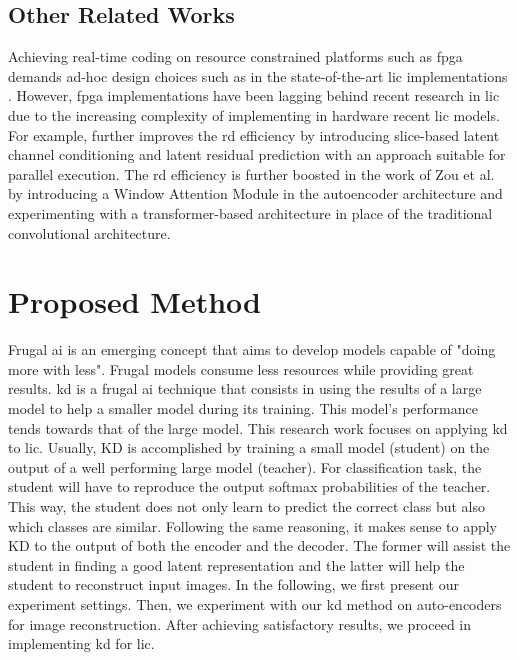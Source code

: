 \documentclass{article}
\begin{document}
\subsection{Other Related Works}
Achieving real-time coding on resource constrained platforms such as \acrfull{fpga} demands ad-hoc design choices such as in the state-of-the-art \acrshort{lic} implementations \cite{9745965, 10494759}. However, \acrshort{fpga} implementations have been lagging behind recent research in \acrshort{lic} due to the increasing complexity of implementing in hardware recent \acrshort{lic} models. For example, \cite{minnen2020channelwiseautoregressiveentropymodels} further improves the \acrshort{rd} efficiency by introducing slice-based latent channel conditioning and latent residual prediction with an approach suitable for parallel execution. The \acrshort{rd} efficiency is further boosted in the work of Zou et al. \cite{zou2022devildetailswindowbasedattention} by introducing a Window Attention Module in the autoencoder architecture and experimenting with a transformer-based architecture in place of the traditional convolutional architecture.

\section{Proposed Method}
\label{proposed_method}
Frugal \acrshort{ai} is an emerging concept that aims to develop models capable of "doing more with less". Frugal models consume less resources while providing great results. \acrshort{kd} is a frugal \acrshort{ai} technique that consists in using the results of a large model to help a smaller model during its training. This model's performance tends towards that of the large model. This research work focuses on applying \acrshort{kd} to \acrshort{lic}. Usually, KD is accomplished by training a small model (student) on the output of a well performing large model (teacher). For classification task, the student will have to reproduce the output softmax probabilities of the teacher. This way, the student does not only learn to predict the correct class but also which classes are similar. Following the same reasoning, it makes sense to apply KD to the output of both the encoder and the decoder. The former will assist the student in finding a good latent representation and the latter will help the student to reconstruct input images. In the following, we first present our experiment settings. Then, we experiment with our \acrshort{kd} method on auto-encoders for image reconstruction. After achieving satisfactory results, we proceed in implementing \acrshort{kd} for \acrshort{lic}.
\end{document}
